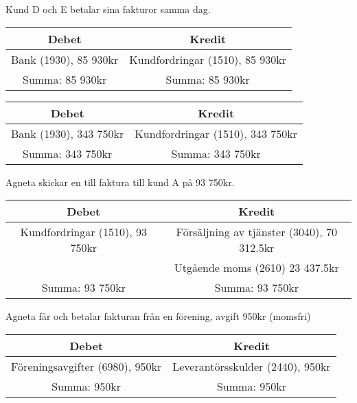 \documentclass[a4paper, titlepage,12pt]{article}
\begin{document}
			Kund D och E betalar sina fakturor samma dag.
			\begin{center}
				\begin{tabular}{|c|c|}
					\hline
					\textbf{Debet} & \textbf{Kredit} \\
					\hline
					Bank (1930), 85 930kr & Kundfordringar (1510), 85 930kr \\
					\hline
					Summa: 85 930kr & Summa: 85 930kr\\
					\hline
				\end{tabular}
			\end{center}


			\begin{center}
				\begin{tabular}{|c|c|}
					\hline
					\textbf{Debet} & \textbf{Kredit} \\
					\hline
					Bank (1930), 343 750kr & Kundfordringar (1510), 343 750kr \\
					\hline
					Summa: 343 750kr & Summa: 343 750kr\\
					\hline
				\end{tabular}
			\end{center}


			Agneta skickar en till faktura till kund A på 93 750kr.
			\begin{center}
				\begin{tabular}{|c|c|}
					\hline
					\textbf{Debet} & \textbf{Kredit} \\
					\hline
					Kundfordringar (1510), 93 750kr & Försäljning av tjänster (3040), 70 312.5kr \\
					\hline
					& Utgående moms (2610) 23 437.5kr \\
					\hline
					Summa: 93 750kr & Summa: 93 750kr\\
					\hline
				\end{tabular}
			\end{center}


			Agneta får och betalar fakturan från en förening, avgift 950kr (momsfri)
			\begin{center}
				\begin{tabular}{|c|c|}
					\hline
					\textbf{Debet} & \textbf{Kredit} \\
					\hline
					Föreningsavgifter (6980), 950kr & Leverantörsskulder (2440), 950kr \\
					\hline
					Summa: 950kr & Summa: 950kr \\
					\hline
				\end{tabular}
			\end{center}
\end{document}
